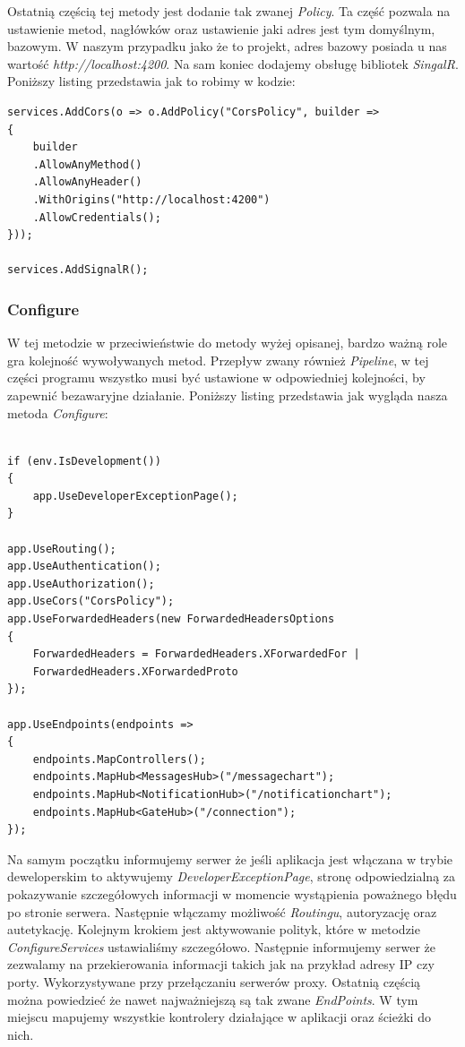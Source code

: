 \documentclass[12pt,a4paper]{article}
\begin{document}
\hspace*{0.7cm} Ostatnią częścią tej metody jest dodanie tak zwanej \textit{Policy}. Ta część pozwala na ustawienie metod, nagłówków oraz ustawienie jaki adres jest tym domyślnym, bazowym. W naszym przypadku jako że to projekt, adres bazowy posiada u nas wartość \textit{http://localhost:4200}. Na sam koniec dodajemy obsługę bibliotek \textit{SingalR}. Poniższy listing przedstawia jak to robimy w kodzie:

\begin{lstlisting}[caption={Polityka oraz dodanie SingalR w konfiguracji}]
services.AddCors(o => o.AddPolicy("CorsPolicy", builder =>
{
	builder
	.AllowAnyMethod()
	.AllowAnyHeader()
	.WithOrigins("http://localhost:4200")
	.AllowCredentials();
}));

services.AddSignalR();
\end{lstlisting}

\subsubsection{Configure}

\hspace*{0.7cm} W tej metodzie w przeciwieństwie do metody wyżej opisanej, bardzo ważną role gra kolejność wywoływanych metod. Przepływ zwany również \textit{Pipeline}, w tej części programu wszystko musi być ustawione w odpowiedniej kolejności, by zapewnić bezawaryjne działanie. Poniższy listing przedstawia jak wygląda nasza metoda \textit{Configure}:\newline

\begin{lstlisting}[caption={Metoda Configure}]

if (env.IsDevelopment())
{
	app.UseDeveloperExceptionPage();
}

app.UseRouting();
app.UseAuthentication();
app.UseAuthorization();
app.UseCors("CorsPolicy");
app.UseForwardedHeaders(new ForwardedHeadersOptions
{
	ForwardedHeaders = ForwardedHeaders.XForwardedFor |
	ForwardedHeaders.XForwardedProto
});

app.UseEndpoints(endpoints =>
{
	endpoints.MapControllers();
	endpoints.MapHub<MessagesHub>("/messagechart");
	endpoints.MapHub<NotificationHub>("/notificationchart");
	endpoints.MapHub<GateHub>("/connection");
});
\end{lstlisting}

\hspace*{0.7cm} Na samym początku informujemy serwer że jeśli aplikacja jest włączana w trybie deweloperskim to aktywujemy \textit{DeveloperExceptionPage}, stronę odpowiedzialną za pokazywanie szczegółowych informacji w momencie wystąpienia poważnego błędu po stronie serwera. Następnie włączamy możliwość \textit{Routingu}, autoryzację oraz autetykację. Kolejnym krokiem jest aktywowanie polityk, które w metodzie \textit{ConfigureServices} ustawialiśmy szczegółowo. Następnie informujemy serwer że zezwalamy na przekierowania informacji takich jak na przykład adresy IP czy porty. Wykorzystywane przy przełączaniu serwerów proxy. Ostatnią częścią można powiedzieć że nawet najważniejszą są tak zwane \textit{EndPoints}. W tym miejscu mapujemy wszystkie kontrolery działające w aplikacji oraz ścieżki do nich.
\end{document}
